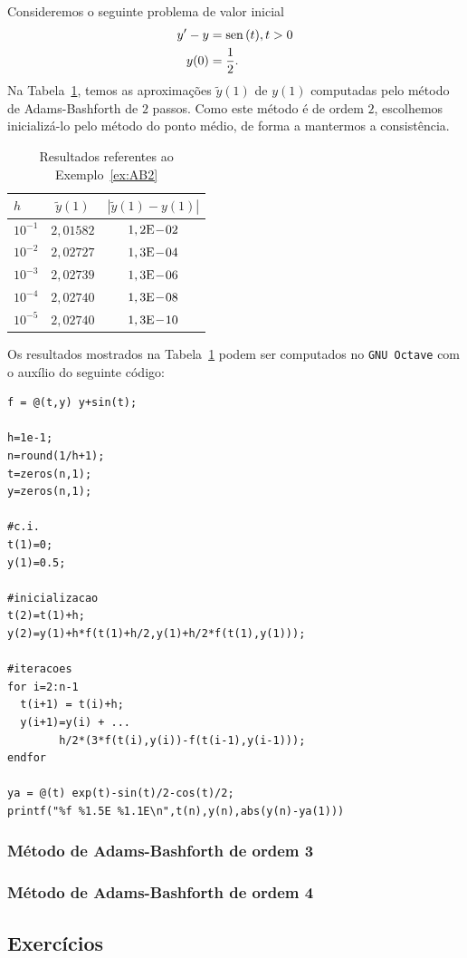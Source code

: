 \begin{ex}\label{ex:AB2}
  Consideremos o seguinte problema de valor inicial
  \begin{align}
    y' - y &= \operatorname{sen}\,(t), t>0\\
    y(0) &= \frac{1}{2}.
  \end{align}
  Na Tabela~\ref{tab:ex_AB2}, temos as aproximações $\tilde{y}(1)$ de $y(1)$ computadas pelo método de Adams-Bashforth de $2$ passos. Como este método é de ordem $2$, escolhemos inicializá-lo pelo método do ponto médio, de forma a mantermos a consistência.
 
  \begin{table}[h!]
    \centering
    \begin{tabular}{l|cc}
      $h$ & $\tilde{y}(1)$ & $|\tilde{y}(1)-y(1)|$\\\hline
      $10^{-1}$ & $2,01582$ & $1,2\mathrm{E}\!-\!02$ \\
      $10^{-2}$ & $2,02727$ & $1,3\mathrm{E}\!-\!04$ \\
      $10^{-3}$ & $2,02739$ & $1,3\mathrm{E}\!-\!06$ \\
      $10^{-4}$ & $2,02740$ & $1,3\mathrm{E}\!-\!08$ \\
      $10^{-5}$ & $2,02740$ & $1,3\mathrm{E}\!-\!10$ \\\hline
    \end{tabular}
    \caption{Resultados referentes ao Exemplo~\ref{ex:AB2}}
    \label{tab:ex_AB2}
  \end{table}

\ifisoctave
Os resultados mostrados na Tabela~\ref{tab:ex_AB2} podem ser computados no \verb+GNU Octave+ com o auxílio do seguinte código:
\begin{verbatim}
f = @(t,y) y+sin(t);

h=1e-1;
n=round(1/h+1);
t=zeros(n,1);
y=zeros(n,1);

#c.i.
t(1)=0;
y(1)=0.5;

#inicializacao
t(2)=t(1)+h;
y(2)=y(1)+h*f(t(1)+h/2,y(1)+h/2*f(t(1),y(1)));

#iteracoes
for i=2:n-1
  t(i+1) = t(i)+h;
  y(i+1)=y(i) + ...
        h/2*(3*f(t(i),y(i))-f(t(i-1),y(i-1)));
endfor

ya = @(t) exp(t)-sin(t)/2-cos(t)/2;
printf("%f %1.5E %1.1E\n",t(n),y(n),abs(y(n)-ya(1)))
\end{verbatim}
\fi
\end{ex}

\subsubsection{Método de Adams-Bashforth de ordem 3}

\subsubsection{Método de Adams-Bashforth de ordem 4}

\emconstrucao

\subsection*{Exercícios}

\emconstrucao